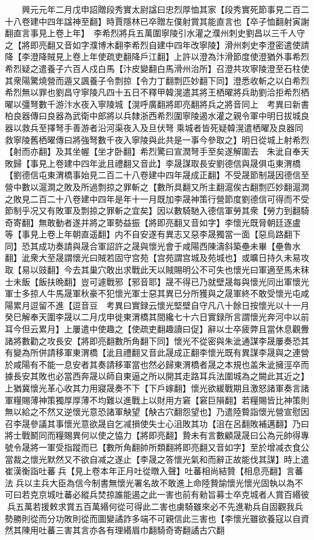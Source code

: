 　　興元元年二月戊申詔贈段秀實太尉諡曰忠烈厚恤其家【段秀實死節事見二百二十八卷建中四年諡神至翻】時賈隱林已卒贈左僕射賞其能直言也【卒子恤翻射寅謝翻直言事見上卷上年】　李希烈將兵五萬圍寧陵引水灌之濮州刺史劉昌以三千人守之【將即亮翻又音如字濮博木翻李希烈自建中四年改寧陵】滑州刺史李澄密遣使請降【李澄降賊見上卷上年使疏吏翻降戶江翻】上許以澄為汴滑節度使澄猶外事希烈希烈疑之遣養子六百人戍白馬【汴皮變翻白馬滑州治所】召澄共攻寧陵澄至石柱使其衆陽驚燒營而遁又諷養子令剽掠【令力丁翻剽匹妙翻下同】澄悉收斬之以白希烈希烈無以罪也劉昌守寧陵凡四十五日不釋甲韓滉遣其將王栖曜將兵助劉洽拒希烈栖曜以彊弩數千游汴水夜入寧陵城【滉呼廣翻將即亮翻將兵之將音同上　考異曰新書柏良器傳曰良器為武衛中郎將以兵隸浙西希烈圍寧陵遏水灌之親令軍中明日拔城良器以救兵至擇弩手善游者沿河渠夜入及旦伏弩乘城者皆死疑韓滉遣栖曜及良器同救寧陵舊栖曜傳曰將強弩數千夜入寧陵與此共是一事今參取之】明日從城上射希烈【射而亦翻】及其坐幄【坐才卧翻】希烈驚曰宣潤弩手至矣遂解圍去　朱泚自奉天敗歸【事見上卷建中四年泚且禮翻又音此】李晟謀取長安劉德信與晟俱屯東渭橋【劉德信屯東渭橋事始見二百二十八卷建中四年晟成正翻】不受晟節制晟因德信至營中數以滬澗之敗及所過剽掠之罪斬之【數所具翻又所主翻滬俟古翻剽匹妙翻滬澗之敗見二百二十八卷建中四年是年十一月既加李晟神策行營節度劉德信可得而不受節制乎况又有敗軍及剽掠之罪斬之宜矣】因以數騎馳入德信軍勞其衆【勞力到翻騎奇寄翻】無敢動者遂并將之軍勢益振【將即亮翻又音如字】李懷光既脅朝廷逐盧等【事見上卷上年朝直遥翻】内不自安遂有異志又惡李晟獨當一面【惡烏路翻下同】恐其成功奏請與晟合軍詔許之晟與懷光會于咸陽西陳濤斜築壘未畢【壘魯水翻】泚衆大至晟謂懷光曰賊若固守宫苑【宫苑謂宫城及苑城也】或曠日持久未易攻取【易以豉翻】今去其巢穴敢出求戰此天以賊賜明公不可失也懷光曰軍適至馬未秣士未飯【飯扶晩翻】豈可遽戰邪【邪音耶】晟不得已乃就壁晟每與懷光同出軍懷光軍士多掠人牛馬晟軍秋豪不犯懷光軍士惡其異已分所獲與之晟軍終不敢受懷光屯咸陽累月逗留不進【逗音豆　考異曰實録云懷光堅壁自守凡八十餘日按懷光以十一月癸巳解奉天圍李晟以二月戊申徙東渭橋其間纔七十六日實録所言謂懷光奔河中以前耳今但云累月】上屢遣中使趣之【使疏吏翻趣讀曰促】辭以士卒疲弊且當休息觀釁諸將數勸之攻長安【將即亮翻數所角翻下同】懷光不從密與朱泚通謀李晟屢奏恐其有變為所併請移軍東渭橋【泚且禮翻又音此晟成正翻李懷光既有異謀李晟與之連營於咸陽有不能一息安者其奏請移軍當也然必歸東渭橋者晟之本規也盖朱泚擁涇卒而據長安其敗也必當西奔晟以師自東逼之所以開其走路耳兵法圍城為之闕此其近之】上猶冀懷光革心收其力用寢晟奏不下【下戶嫁翻】懷光欲緩戰期且激怒諸軍奏言諸軍糧賜薄神策獨厚厚薄不均難以進戰上以財用方窘【窘巨隕翻】若糧賜皆比神策則無以給之不然又逆懷光意恐諸軍觖望【觖古穴翻怨望也】乃遣陸䞇詣懷光營宣慰因召李晟參議其事懷光意欲晟自乞减損使失士心沮敗其功【沮在呂翻敗補邁翻】乃曰將士戰鬭同而糧賜異何以使之恊力【將即亮翻】贄未有言數顧晟晟曰公為元帥得專號令晟將一軍受指蹤而已【數所角翻帥所類翻將即亮翻又音如字】至於增减衣食公當裁之懷光默然又不欲自减之遂止【李晟之答懷光氣和而辭正故能伐其謀】時上遣崔漢衡詣吐蕃兵【見上卷本年正月吐從暾入聲】吐蕃相尚結贊【相息亮翻】言蕃法兵以主兵大臣為信今制書無懷光署名故不敢進上命陸贄諭懷光懷光固執以為不可曰若克京城吐蕃必縱兵焚掠誰能遏之此一害也前有勑旨募士卒克城者人賞百緡彼兵五萬若援敕求賞五百萬緡何從可得此二害也虜騎雖來必不先進勒兵自固觀我兵勢勝則從而分功敗則從而圖變譎詐多端不可親信此三害也【李懷光雖欲養寇以自資然其陳用吐蕃三害其言亦各有理緡眉巾翻騎奇寄翻譎古穴翻